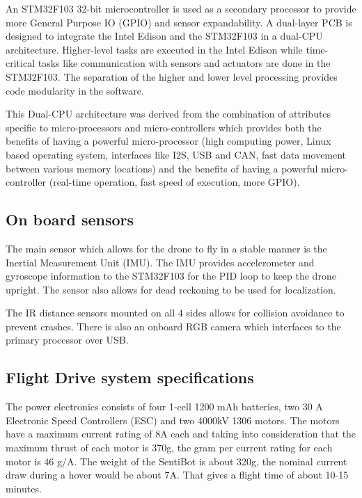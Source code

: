\documentclass[12pt]{article}
\begin{document}
An STM32F103 32-bit microcontroller is used as a secondary processor to provide more General Purpose IO (GPIO) and sensor expandability. A dual-layer PCB is designed to integrate the Intel Edison and the STM32F103 in a dual-CPU architecture. Higher-level tasks are executed in the Intel Edison while time-critical tasks like communication with sensors and actuators are done in the STM32F103. The separation of the higher and lower level processing provides code modularity in the software.

This Dual-CPU architecture was derived from the combination of attributes specific to micro-processors and micro-controllers which provides both the benefits of having a powerful micro-processor (high computing power, Linux based operating system, interfaces like I2S, USB and CAN, fast data movement between various memory locations) and the benefits of having a powerful micro-controller (real-time operation, fast speed of execution, more GPIO). 

\subsection{On board sensors}

The main sensor which allows for the drone to fly in a stable manner is the Inertial Measurement Unit (IMU). The IMU provides accelerometer and gyroscope information to the STM32F103 for the PID loop to keep the drone upright. The sensor also allows for dead reckoning to be used for localization\cite{ultrasonic}.

The IR distance sensors mounted on all 4 sides allows for collision avoidance to prevent crashes. There is also an onboard RGB camera which interfaces to the primary processor over USB. 

\subsection{Flight Drive system specifications}

The power electronics consists of four 1-cell 1200 mAh batteries, two 30 A Electronic Speed Controllers (ESC) and two 4000kV 1306 motors. The motors have a maximum current rating of 8A each and taking into consideration that the maximum thrust of each motor is 370g, the gram per current rating for each motor is 46 g/A. The weight of the SentiBot is about 320g, the nominal current draw during a hover would be about 7A. That gives a flight time of about 10-15 minutes. 
\end{document}
